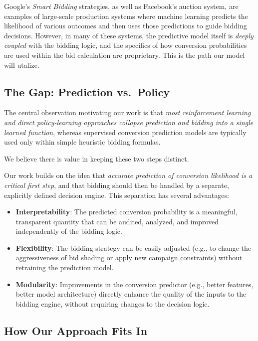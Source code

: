 \documentclass[11pt]{article}
\begin{document}
Google's \emph{Smart Bidding} strategies, as well as Facebook’s auction system, are examples of large-scale production systems where machine learning predicts the likelihood of various outcomes and then uses those predictions to guide bidding decisions. However, in many of these systems, the predictive model itself is \emph{deeply coupled} with the bidding logic, and the specifics of how conversion probabilities are used within the bid calculation are proprietary. This is the path our model will utalize.

\subsection{The Gap: Prediction vs.\ Policy}

The central observation motivating our work is that \emph{most reinforcement learning and direct policy-learning approaches collapse prediction and bidding into a single learned function}, whereas supervised conversion prediction models are typically used only within simple heuristic bidding formulas.

We believe there is value in keeping these two steps distinct.

Our work builds on the idea that \emph{accurate prediction of conversion likelihood is a critical first step}, and that bidding should then be handled by a separate, explicitly defined decision engine. This separation has several advantages:

\begin{itemize}
    \item \textbf{Interpretability}: The predicted conversion probability is a meaningful, transparent quantity that can be audited, analyzed, and improved independently of the bidding logic.
    \item \textbf{Flexibility}: The bidding strategy can be easily adjusted (e.g., to change the aggressiveness of bid shading or apply new campaign constraints) without retraining the prediction model.
    \item \textbf{Modularity}: Improvements in the conversion predictor (e.g., better features, better model architecture) directly enhance the quality of the inputs to the bidding engine, without requiring changes to the decision logic.
\end{itemize}

\subsection{How Our Approach Fits In}
\end{document}
